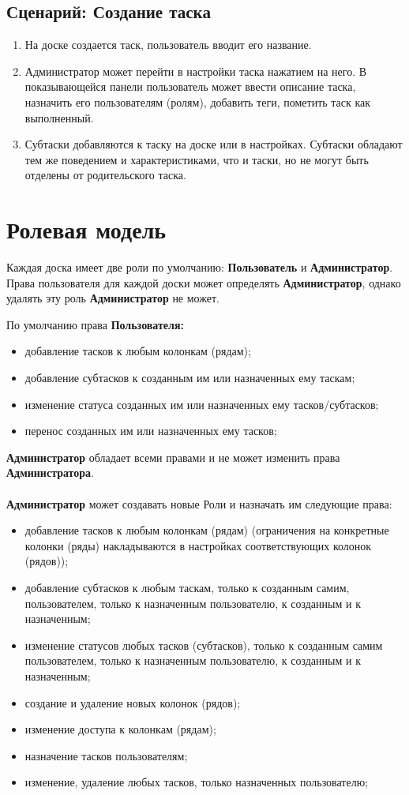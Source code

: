 \documentclass{tmcorreport}
\begin{document}
\subsection*{Сценарий: Создание таска}
\begin{enumerate}
    \item На доске создается таск, пользователь вводит его название.
    \item Администратор может перейти в настройки таска нажатием на него. В показывающейся панели пользователь может ввести описание таска, назначить его пользователям (ролям), добавить теги, пометить таск как выполненный.
    \item Субтаски добавляются к таску на доске или в настройках. Субтаски обладают тем же поведением и характеристиками, что и таски, но не могут быть отделены от родительского таска.
\end{enumerate}

\section{Ролевая модель}
Каждая доска имеет две роли по умолчанию: \textbf{Пользователь} и \textbf{Администратор}. Права пользователя для каждой доски может определять \textbf{Администратор}, однако удалять эту роль \textbf{Администратор} не может. 

По умолчанию права \textbf{Пользователя:}
\begin{itemize}
    \item добавление тасков к любым колонкам (рядам);
    \item добавление субтасков к созданным им или назначенных ему таскам;
    \item изменение статуса созданных им или назначенных ему тасков/субтасков;
    \item перенос созданных им или назначенных ему тасков;
\end{itemize}
\textbf{Администратор} обладает всеми правами и не может изменить права \textbf{Администратора}.\\\\
\textbf{Администратор} может создавать новые Роли и назначать им следующие права:
\begin{itemize}
    \item добавление тасков к любым колонкам (рядам) (ограничения на конкретные колонки (ряды) накладываются в настройках соответствующих колонок (рядов));
    \item добавление субтасков к любым таскам, только к созданным самим, пользователем, только к назначенным пользователю, к созданным и к назначенным;
    \item изменение статусов любых тасков (субтасков), только к созданным самим пользователем, только к назначенным пользователю, к созданным и к назначенным;
    \item создание и удаление новых колонок (рядов);
    \item изменение доступа к колонкам (рядам);
    \item назначение тасков пользователям;
    \item изменение, удаление любых тасков, только назначенных пользователю;
\end{itemize}
\end{document}
